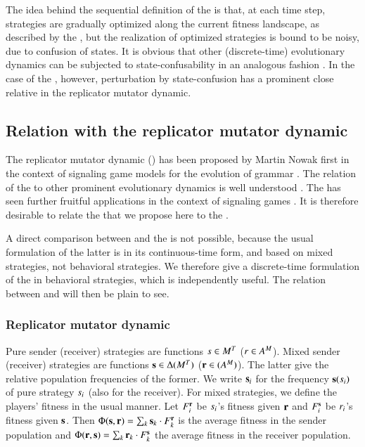 The idea behind the sequential definition of the \rdd is that, at each
time step, strategies are gradually optimized along the current
fitness landscape, as described by the \rd, but the realization of
optimized strategies is bound to be noisy, due to confusion of
states. It is obvious that other (discrete-time) evolutionary dynamics
can be subjected to state-confusability in an analogous fashion
\citep{Correia2013:The-Bivalent-Tr}. In the case of the \rd, however,
perturbation by state-confusion has a prominent close relative in the
replicator mutator dynamic.

\subsection{Relation with the replicator mutator dynamic}

The replicator mutator dynamic (\rmd) has been proposed by Martin
Nowak first in the context of signaling game models for the evolution
of grammar
\citep[e.g.][]{KomarovaNiyogi2001:The-Evolutionar,NowakKomarova2001:Evolution-of-Un,Nowak2006:Evolutionary-Dy}. The
relation of the \rmd to other prominent evolutionary dynamics is well
understood \citep{PageNowak2002:Unifying-Evolut}. The \rmd has seen
further fruitful applications in the context of signaling games
\citep{HutteggerSkyrms2010:Evolutionary-Dy}. It is therefore desirable
to relate the \rdd that we propose here to the \rmd.

A direct comparison between \rdd and the \rmd is not possible, because
the usual formulation of the latter is in its continuous-time form,
and based on mixed strategies, not behavioral strategies. We therefore
give a discrete-time formulation of the \rmd in behavioral strategies,
which is independently useful. The relation between \rdd and \rmd will
then be plain to see.

\subsubsection{Replicator mutator dynamic}

Pure sender (receiver) strategies are functions $s \in
M^T$ ($r \in A^M$). Mixed sender (receiver)
strategies are functions $\mathrm{\mathbf{s}} \in \Delta(M^T)$
($\mathrm{\mathbf{r}} \in (A^M)$). The latter give the relative
population frequencies of the former. We write $\mathrm{\mathbf{s}}_i$ for the
frequency $\mathrm{\mathbf{s}}(s_i)$ of pure strategy $s_i$ (also for
the receiver). For mixed strategies, we define the players' fitness in
the usual manner. Let $F_i^{\mathrm{\mathbf{r}}}$ be $s_i$'s fitness given
$\mathrm{\mathbf{r}}$ and $F_i^{\mathrm{\mathbf{s}}}$ be $r_i$'s fitness given
$\mathrm{\mathbf{s}}$. Then $\Phi(\mathrm{\mathbf{s}},\mathrm{\mathbf{r}}) = \sum_{k} \mathrm{\mathbf{s}}_k \cdot
F_k^{\mathrm{\mathbf{r}}}$ is the average fitness in the sender population and
$\Phi(\mathrm{\mathbf{r}},\mathrm{\mathbf{s}}) = \sum_{k} \mathrm{\mathbf{r}}_k \cdot F_k^{\mathrm{\mathbf{s}}}$ the
average fitness in the receiver population.


